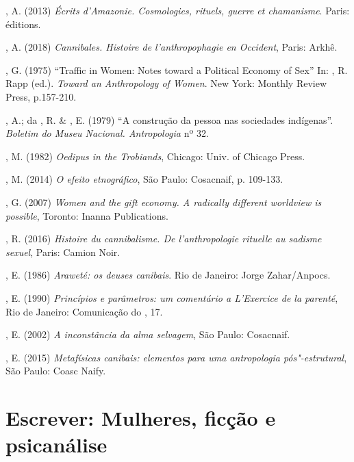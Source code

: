 , A. (2013) \emph{Écrits d'Amazonie. Cosmologies, rituels, guerre
et chamanisme}. Paris:  éditions.

, A. (2018) \emph{Cannibales. Histoire de l'anthropophagie en
Occident}, Paris: Arkhê.

, G. (1975) ``Traffic in Women: Notes toward a Political Economy of
Sex'' In: , R. Rapp (ed.). \emph{Toward an Anthropology of Women}.
New York: Monthly Review Press, p.157-210.

, A.; da , R. \& , E. (1979) ``A construção da pessoa nas sociedades indígenas''. \emph{Boletim do Museu Nacional.
Antropologia} nº 32.

, M. (1982) \emph{Oedipus in the Trobiands}, Chicago: Univ. of
Chicago Press.

, M. (2014) \emph{O efeito etnográfico}, São Paulo: Cosacnaif,
p. 109-133.

, G. (2007) \emph{Women and the gift economy. A radically
different worldview is possible}, Toronto: Inanna Publications.

, R. (2016) \emph{Histoire du cannibalisme. De l'anthropologie
rituelle au sadisme sexuel}, Paris: Camion Noir.

, E. (1986) \emph{Araweté: os deuses canibais}. Rio de
Janeiro: Jorge Zahar/Anpocs.

, E. (1990) \emph{Princípios e parâmetros: um
comentário a L'Exercice de la parenté}, Rio de Janeiro: Comunicação
do , 17.

, E. (2002) \emph{A inconstância da alma selvagem},
São Paulo: Cosacnaif.

, E. (2015) \emph{Metafísicas canibais: elementos para
uma antropologia pós"-estrutural}, São Paulo: Coasc Naify.

\chapter*{Escrever: Mulheres, ficção e psicanálise}

